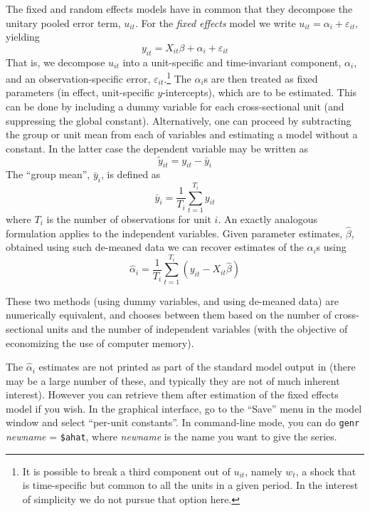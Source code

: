 The fixed and random effects models have in common that they decompose
the unitary pooled error term, $u_{it}$.  For the \textsl{fixed effects}
model we write $u_{it} = \alpha_i + \varepsilon_{it}$, yielding
\begin{equation}
\label{eq:FE}
y_{it} = X_{it}\beta + \alpha_i + \varepsilon_{it}
\end{equation}
That is, we decompose $u_{it}$ into a unit-specific and time-invariant
component, $\alpha_i$, and an observation-specific error,
$\varepsilon_{it}$.\footnote{It is possible to break a third component
  out of $u_{it}$, namely $w_t$, a shock that is time-specific but
  common to all the units in a given period.  In the interest of
  simplicity we do not pursue that option here.}  The $\alpha_i$s are
then treated as fixed parameters (in effect, unit-specific
$y$-intercepts), which are to be estimated.  This can be done by
including a dummy variable for each cross-sectional unit (and
suppressing the global constant).  Alternatively, one can proceed by
subtracting the group or unit mean from each of variables and
estimating a model without a constant.  In the latter case the
dependent variable may be written as
\[
\tilde{y}_{it} = y_{it} - \bar{y}_i
\]
The ``group mean'', $\bar{y}_i$, is defined as
\[
\bar{y}_i = \frac{1}{T_i} \sum_{t=1}^{T_i} y_{it}
\]
where $T_i$ is the number of observations for unit $i$.  An exactly
analogous formulation applies to the independent variables.  Given
parameter estimates, $\hat{\beta}$, obtained using such de-meaned data
we can recover estimates of the $\alpha_i$s using
\[
\hat{\alpha}_i = \frac{1}{T_i} \sum_{t=1}^{T_i} 
   \left(y_{it} - X_{it}\hat{\beta}\right)
\]

These two methods (using dummy variables, and using de-meaned data) are
numerically equivalent, and  chooses between them based on
the number of cross-sectional units and the number of independent
variables (with the objective of economizing the use of computer memory).

The $\hat{\alpha}_i$ estimates are not printed as part of the standard
model output in  (there may be a large number of these, and
typically they are not of much inherent interest).  However you can
retrieve them after estimation of the fixed effects model if you
wish.  In the graphical interface, go to the ``Save'' menu in the
model window and select ``per-unit constants''.  In command-line mode,
you can do \texttt{genr} \textsl{newname} = \verb+$ahat+, where
\textsl{newname} is the name you want to give the series. 

